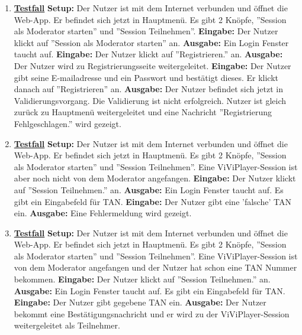 \begin{enumerate}
	\item \underline{\textbf{Testfall}} \linebreak
	\textbf{Setup:} Der Nutzer ist mit dem Internet verbunden und öffnet die Web-App. Er befindet sich jetzt in Hauptmenü. Es gibt 2 Knöpfe, ''Session als Moderator starten'' und ''Session Teilnehmen''. \linebreak
	\textbf{Eingabe:} Der Nutzer klickt auf ''Session als Moderator starten'' an. \linebreak
	\textbf{Ausgabe:} Ein Login Fenster taucht auf.\linebreak
	\textbf{Eingabe:} Der Nutzer klickt auf ''Registrieren.'' an.\linebreak
	\textbf{Ausgabe:} Der Nutzer wird zu Registrierungsseite weitergeleitet.\linebreak
	\textbf{Eingabe:} Der Nutzer gibt seine E-mailadresse und ein Passwort und bestätigt dieses. Er klickt danach auf ''Registrieren'' an. \linebreak
	\textbf{Ausgabe:} Der Nutzer befindet sich jetzt in Validierungsvorgang. Die Validierung ist nicht erfolgreich. Nutzer ist gleich zurück zu Hauptmenü weitergeleitet und eine Nachricht ''Registrierung Fehlgeschlagen.'' wird gezeigt.\linebreak
	
	\item \underline{\textbf{Testfall}} \linebreak
	\textbf{Setup:} Der Nutzer ist mit dem Internet verbunden und öffnet die Web-App. Er befindet sich jetzt in Hauptmenü. Es gibt 2 Knöpfe, ''Session als Moderator starten'' und ''Session Teilnehmen''.
	Eine ViViPlayer-Session ist aber noch nicht von dem Moderator angefangen. \linebreak
	\textbf{Eingabe:} Der Nutzer klickt auf ''Session Teilnehmen.'' an. \linebreak
	\textbf{Ausgabe:} Ein Login Fenster taucht auf. Es gibt ein Eingabefeld für TAN.\linebreak
	\textbf{Eingabe:} Der Nutzer gibt eine 'falsche' TAN ein. \linebreak
	\textbf{Ausgabe:} Eine Fehlermeldung wird gezeigt.
	
	\item \underline{\textbf{Testfall}} \linebreak
	\textbf{Setup:} Der Nutzer ist mit dem Internet verbunden und öffnet die Web-App. Er befindet sich jetzt in Hauptmenü. Es gibt 2 Knöpfe, ''Session als Moderator starten'' und ''Session Teilnehmen''. Eine ViViPlayer-Session ist von dem Moderator angefangen und der Nutzer hat schon eine TAN Nummer bekommen. \linebreak
	\textbf{Eingabe:} Der Nutzer klickt auf ''Session Teilnehmen.'' an. \linebreak
	\textbf{Ausgabe:} Ein Login Fenster taucht auf. Es gibt ein Eingabefeld für TAN.\linebreak
	\textbf{Eingabe:} Der Nutzer gibt gegebene TAN ein. \linebreak
	\textbf{Ausgabe:} Der Nutzer bekommt eine Bestätigungsnachricht und er wird zu der ViViPlayer-Session weitergeleitet als Teilnehmer.
	

\end{enumerate}

